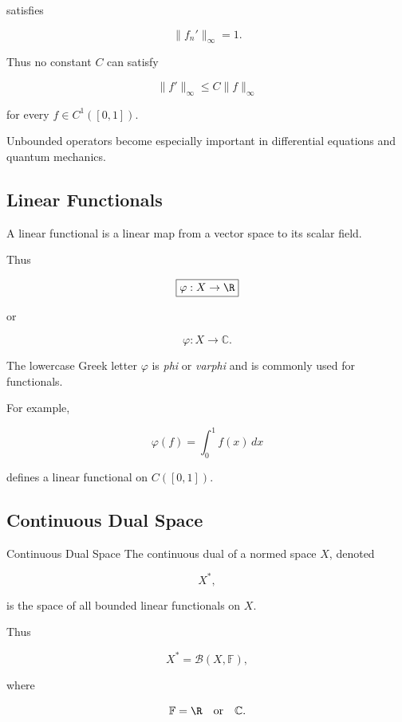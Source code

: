 satisfies

\[
\|f_n'\|_\infty=1.
\]

Thus no constant \(C\) can satisfy

\[
\|f'\|_\infty
\leq
C\|f\|_\infty
\]

for every \(f\in C^1([0,1])\).

Unbounded operators become especially important in differential equations
and quantum mechanics.

\subsection{Linear Functionals}
\label{subsec:linear-functionals}

A linear functional is a linear map from a vector space to its scalar
field.

Thus

\[
\boxed{
\varphi:X\to\R
}
\]

or

\[
\boxed{
\varphi:X\to\mathbb{C}.
}
\]

The lowercase Greek letter \(\varphi\) is \emph{phi} or \emph{varphi} and
is commonly used for functionals.

For example,

\[
\boxed{
\varphi(f)
=
\int_0^1f(x)\,dx
}
\]

defines a linear functional on \(C([0,1])\).

\subsection{Continuous Dual Space}
\label{subsec:continuous-dual-space}

\begin{definitionbox}{Continuous Dual Space}
The continuous dual of a normed space \(X\), denoted

\[
\boxed{
X^*,
}
\]

is the space of all bounded linear functionals on \(X\).
\end{definitionbox}

Thus

\[
\boxed{
X^*
=
\mathcal{B}(X,\mathbb{F}),
}
\]

where

\[
\mathbb{F}
=
\R
\quad\text{or}\quad
\mathbb{C}.
\]


